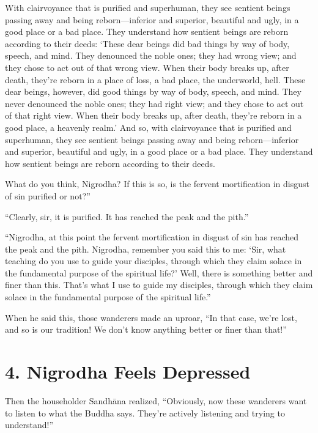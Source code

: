 \documentclass[12pt,openany]{book}%
\begin{document}
With clairvoyance that is purified and superhuman, they see sentient beings passing away and being reborn—inferior and superior, beautiful and ugly, in a good place or a bad place. They understand how sentient beings are reborn according to their deeds: ‘These dear beings did bad things by way of body, speech, and mind. They denounced the noble ones; they had wrong view; and they chose to act out of that wrong view. When their body breaks up, after death, they’re reborn in a place of loss, a bad place, the underworld, hell. These dear beings, however, did good things by way of body, speech, and mind. They never denounced the noble ones; they had right view; and they chose to act out of that right view. When their body breaks up, after death, they’re reborn in a good place, a heavenly realm.’ And so, with clairvoyance that is purified and superhuman, they see sentient beings passing away and being reborn—inferior and superior, beautiful and ugly, in a good place or a bad place. They understand how sentient beings are reborn according to their deeds. 

What do you think, Nigrodha? If this is so, is the fervent mortification in disgust of sin purified or not?” 

“Clearly, sir, it is purified. It has reached the peak and the pith.” 

“Nigrodha, at this point the fervent mortification in disgust of sin has reached the peak and the pith. Nigrodha, remember you said this to me: ‘Sir, what teaching do you use to guide your disciples, through which they claim solace in the fundamental purpose of the spiritual life?’ Well, there is something better and finer than this. That’s what I use to guide my disciples, through which they claim solace in the fundamental purpose of the spiritual life.” 

When he said this, those wanderers made an uproar, “In that case, we’re lost, and so is our tradition! We don’t know anything better or finer than that!” 

\section*{4. Nigrodha Feels Depressed }

Then the householder \textsanskrit{Sandhāna} realized, “Obviously, now these wanderers want to listen to what the Buddha says. They’re actively listening and trying to understand!” 
\end{document}
